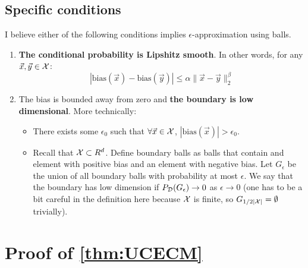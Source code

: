 \documentclass{article}
\newcommand{\X}{{\cal X}}
\newcommand{\D}{{\cal D}}
\newcommand{\x}{\vec{x}}
\newcommand{\y}{\vec{y}}
\newcommand{\bias}{\text{bias}}
\begin{document}
\subsection{Specific conditions}

I believe either of the following conditions implies
$\epsilon$-approximation using balls.

\begin{enumerate}
\item
  {\bf The conditional probability is Lipshitz smooth}. In other words, for
any $\x,\y \in \X$:
\[
|\bias(\x) - \bias(\y)| \leq \alpha \|\x-\y\|_2^{\beta}
\]
\item
The bias is bounded away from zero and {\bf the boundary is low
dimensional}. More technically:
\begin{itemize}
\item There exists some $\epsilon_0$ such that $\forall \x \in \X$, $|\bias(\x)|>\epsilon_0$.
\item Recall that $\X \subset R^d$. Define boundary balls as balls
  that contain and element with positive bias and an element with
  negative bias. Let $G_{\epsilon}$ be the union of all boundary balls
  with probability at most $\epsilon$. We say that the boundary has
  low dimension if $P_{\D}(G_{\epsilon}) \to 0$ as $\epsilon \to 0$
  (one has to be a bit careful in the definition here because $\X$ is finite, so
  $G_{1/2|\X|}=\emptyset$ trivially).  
\end{itemize}
\end{enumerate}

\appendix

\section{Proof of \ref{thm:UCECM}}
\end{document}

